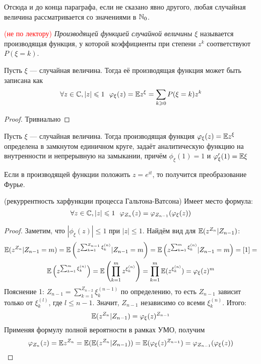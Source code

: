 \begin{note}
	Отсюда и до конца параграфа, если не сказано явно другого, любая случайная величина рассматривается со значениями в $\mathbb{N}_0$.
\end{note}

\begin{definition} \textcolor{red}{(не по лектору)}
	\textit{Производящей функцией случайной величины $\xi$} называется производящая функция, у которой коэффициенты при степени $z^k$ соответствуют $P(\xi = k)$.
\end{definition}

\begin{proposition}
	Пусть $\xi$ --- случайная величина. Тогда её производящая функция может быть записана как
	\[
		\forall z \in \Cm, |z| \le 1\ \ \phi_\xi(z) = \E z^\xi = \sum_{k \ge 0} P(\xi = k)z^k
	\]
\end{proposition}

\begin{proof}
	Тривиально
\end{proof}

\begin{proposition}
	Пусть $\xi$ --- случайная величина. Тогда производящая функция $\varphi_\xi(z) = \mathbb{E} z^\xi$ определена в замкнутом единичном круге, задаёт аналитическую функцию на внутренности и непрерывную на замыкании, причём $\phi_\xi(1) = 1$ и $\varphi'_\xi(1) = \mathbb{E}\xi$
\end{proposition}

\begin{note}
	Если в производящей функции положить $z = e^{it}$, то получится преобразование Фурье.
\end{note}

\begin{lemma} (рекуррентность харфункции процесса Гальтона-Ватсона)
	Имеет место формула:
	\[
		\forall z \in \Cm, |z| \le 1\ \ \phi_{Z_n}(z) = \phi_{Z_{n - 1}}(\phi_\xi(z))
	\]
\end{lemma}

\begin{proof}
	Заметим, что $|\phi_\xi(z)| \le 1$ при $|z| \le 1$. Найдём вид для $\mathbb{E}(z^{Z_n} | Z_{n - 1})$:
	\begin{multline*}
		\mathbb{E}(z^{Z_n} | Z_{n - 1} = m) = \mathbb{E}\left(z^{\sum_{k = 1}^{Z_{n - 1}} \xi_k^{(n)}} | Z_{n - 1} = m\right) = \mathbb{E}\left(z^{\sum_{k = 1}^m \xi_k^{(n)}} | Z_{n - 1} = m\right) = [1] =
		\\
		\mathbb{E}\left(z^{\sum_{k = 1}^m \xi_k^{(n)}}\right) = \mathbb{E}\left(\prod_{k = 1}^m z^{\xi_k^{(n)}}\right) = \prod_{k = 1}^m \mathbb{E}(z^{\xi_k^{(n)}}) = \varphi_\xi(z)^m
	\end{multline*}
	Пояснение 1: $Z_{n - 1} = \sum_{k = 1}^{Z_{n - 2}} \xi_k^{(n - 1)}$ по определению, то есть $Z_{n - 1}$ зависит только от $\xi_k^{(l)}$, где $l \le n - 1$. Значит, $Z_{n - 1}$ независимо со всеми $\xi_k^{(n)}$. Итого:
	\[
		\mathbb{E}(z^{Z_n} | Z_{n - 1}) = \varphi_\xi(z)^{Z_{n - 1}}
	\]
	Применяя формулу полной вероятности в рамках УМО, получим
	\[
		\varphi_{Z_n}(z) = \mathbb{E} z^{Z_n} = \mathbb{E}(\mathbb{E}(z^{Z_n} | Z_{n - 1})) = \mathbb{E}(\varphi_\xi(z)^{Z_{n - 1}}) = \varphi_{Z_{n - 1}}(\varphi_\xi(z))
	\]
\end{proof}

